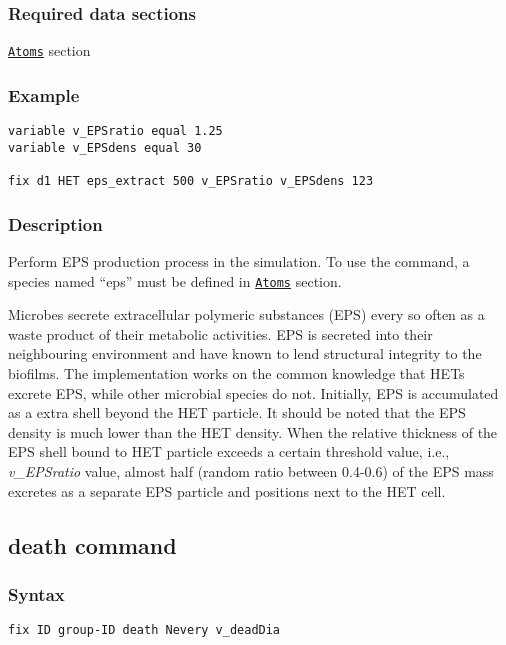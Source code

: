 \documentclass[11pt,a4paper,openright]{article}
\begin{document}
\subsubsection*{Required data sections} 
\hyperref[satom]{\tt Atoms} section

\subsubsection*{Example}

\begin{Verbatim}[frame=single]
variable v_EPSratio equal 1.25
variable v_EPSdens equal 30
    
fix d1 HET eps_extract 500 v_EPSratio v_EPSdens 123
\end{Verbatim}

\subsubsection*{Description}

Perform EPS production process in the simulation. To use the command, a species named ``eps'' must be defined in 
\hyperref[satom]{\tt Atoms} section.

Microbes secrete extracellular polymeric substances (EPS) every so often
as a waste product of their metabolic activities. EPS is secreted into their
neighbouring environment and have known to lend structural integrity to
the biofilms. The implementation works on the common knowledge that HETs 
excrete EPS, while other microbial species do not. Initially, EPS is accumulated
as a extra shell beyond the HET particle. It should be noted that
the EPS density is much lower than the HET density. When the relative
thickness of the EPS shell bound to HET particle exceeds a certain threshold
value, i.e., {\it v\_EPSratio} value, 
almost half (random ratio between 0.4-0.6) of the EPS mass excretes
as a separate EPS particle and positions next to the HET cell.

\newpage

\subsection{death command}
\label{death}
\subsubsection*{Syntax}

\begin{Verbatim}[frame=single]
fix ID group-ID death Nevery v_deadDia
\end{Verbatim}
\end{document}
